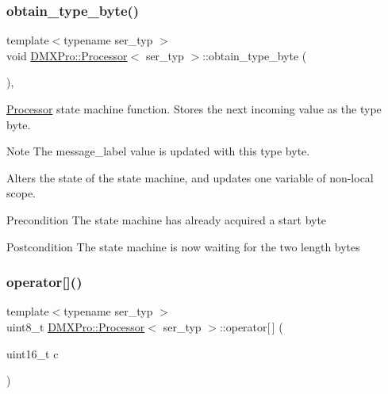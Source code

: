 \subsubsection{\texorpdfstring{obtain\+\_\+type\+\_\+byte()}{obtain\_type\_byte()}}
{\footnotesize\ttfamily template$<$typename ser\+\_\+typ $>$ \\
void \hyperlink{classDMXPro_1_1Processor}{D\+M\+X\+Pro\+::\+Processor}$<$ ser\+\_\+typ $>$\+::obtain\+\_\+type\+\_\+byte (\begin{DoxyParamCaption}{ }\end{DoxyParamCaption})\hspace{0.3cm}{\ttfamily [inline]}, {\ttfamily [private]}}



\hyperlink{classDMXPro_1_1Processor}{Processor} state machine function. Stores the next incoming value as the type byte. 

\begin{DoxyNote}{Note}
The message\+\_\+label value is updated with this type byte.
\end{DoxyNote}
Alters the state of the state machine, and updates one variable of non-\/local scope.

\begin{DoxyPrecond}{Precondition}
The state machine has already acquired a start byte 
\end{DoxyPrecond}
\begin{DoxyPostcond}{Postcondition}
The state machine is now waiting for the two length bytes 
\end{DoxyPostcond}
\mbox{\label{classDMXPro_1_1Processor_a93e71e87740b0464504f829297bb654f}} 
\subsubsection{\texorpdfstring{operator[]()}{operator[]()}}
{\footnotesize\ttfamily template$<$typename ser\+\_\+typ $>$ \\
uint8\+\_\+t \hyperlink{classDMXPro_1_1Processor}{D\+M\+X\+Pro\+::\+Processor}$<$ ser\+\_\+typ $>$\+::operator\mbox{[}$\,$\mbox{]} (\begin{DoxyParamCaption}\item[{uint16\+\_\+t}]{c }\end{DoxyParamCaption})\hspace{0.3cm}{\ttfamily [inline]}}



